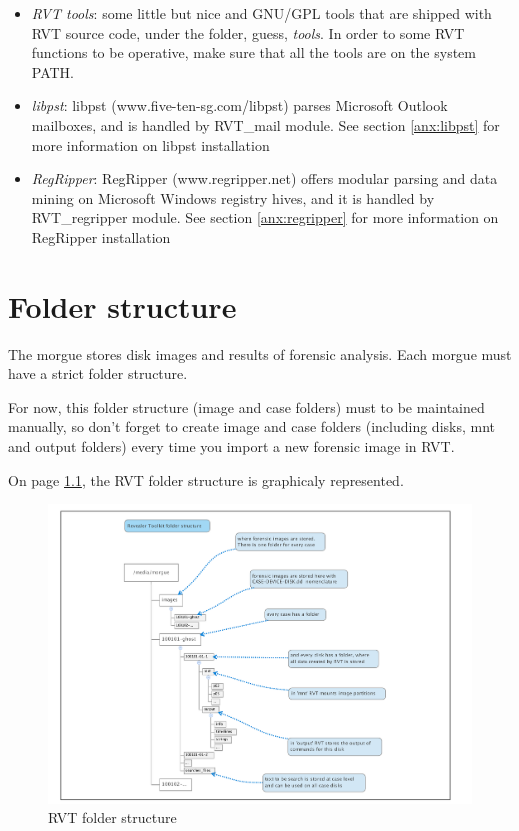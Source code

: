 \documentclass[a4paper,11pt,oneside]{report}
\begin{document}
\begin{itemize}
\item \emph{RVT tools}: some little but nice and GNU/GPL tools that are shipped with RVT source code, under the folder, guess, \emph{tools}. In order to some RVT functions to be operative, make sure that all the tools are on the system PATH.
\item \emph{libpst}:  libpst (www.five-ten-sg.com/libpst) parses Microsoft Outlook mailboxes, and is handled by RVT\_mail module. See section \ref{anx:libpst} for more information on libpst installation
\item \emph{RegRipper}:  RegRipper (www.regripper.net) offers modular parsing and data mining on Microsoft Windows registry hives, and it is handled by RVT\_regripper module. See section \ref{anx:regripper} for more information on RegRipper installation
\end{itemize}





\chapter{Folder structure}

The morgue stores disk images and results of forensic analysis. Each morgue must have a strict folder structure. 

For now, this folder structure (image and case folders) must to be maintained manually, so don't forget to create image and case folders (including disks, mnt and output folders) every time you import a new forensic image in RVT.

On page \ref{img:folderstructure}, the RVT folder structure is graphicaly represented.

\begin{figure}[p]
\centering
\includegraphics[width=\textheight,angle=270]{images/RVT_folder_structure.pdf} 
\caption{RVT folder structure} \label{img:folderstructure}
\end{figure}
\end{document}

